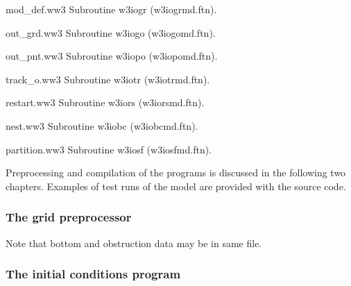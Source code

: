 \begin{list}{}{\itemsep 0mm \parsep 0mm \leftmargin 40mm }
\item[{mod\_def.ww3} \hfill] Subroutine {\F w3iogr} ({\file w3iogrmd.ftn}).
\item[{out\_grd.ww3} \hfill] Subroutine {\F w3iogo} ({\file w3iogomd.ftn}).
\item[{out\_pnt.ww3} \hfill] Subroutine {\F w3iopo} ({\file w3iopomd.ftn}).
\item[{track\_o.ww3} \hfill] Subroutine {\F w3iotr} ({\file w3iotrmd.ftn}).
\item[{restart.ww3}  \hfill] Subroutine {\F w3iors} ({\file w3iorsmd.ftn}).
\item[{nest.ww3}     \hfill] Subroutine {\F w3iobc} ({\file w3iobcmd.ftn}).
\item[{partition.ww3}\hfill] Subroutine {\F w3iosf} ({\file w3iosfmd.ftn}).
\end{list}

\noindent
Preprocessing and compilation of the programs is discussed in the following
two chapters. Examples of test runs of the model are provided with the source
code.


\pb

\vsssub
\subsubsection{The grid preprocessor} \label{sub:ww3grid}
\vsssub


\vspace{\baselineskip} \noindent
Note that bottom and obstruction data may be in same file.



\pb
\vsssub
\subsubsection{The initial conditions program} 
\vsssub

